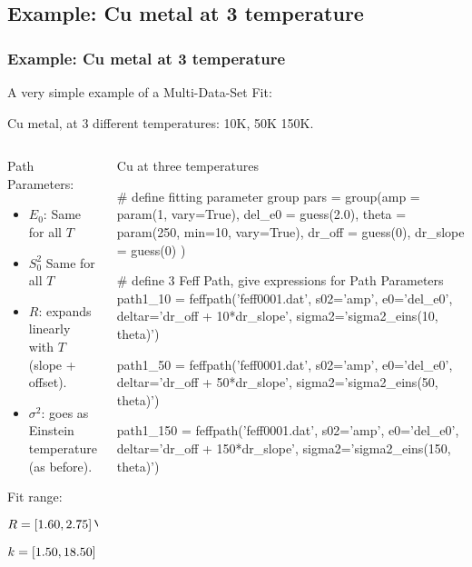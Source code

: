
\subsection{Example: Cu metal at 3 temperature}
\begin{frame}[fragile] \frametitle{Example: Cu metal at 3 temperature}


    A very simple example of a Multi-Data-Set Fit:

    Cu metal, at 3 different  temperatures: 10K, 50K 150K.

   \begin{columns}
     \begin{column}{48mm}
        \vmm  Path Parameters:
       \begin{itemize}
       \item $E_0$:  Same for all $T$
       \item $S_0^2$  Same for all $T$
       \item $R$:  expands linearly with $T$ (slope + offset).
       \item $\sigma^2$:  goes as Einstein temperature (as before).
       \end{itemize}

       {}

       \vmm Fit range: \vmm

       \hspace{2mm} $R = [1.60, 2.75] \rm\, \AA$

       \vmm
       \hspace{2mm}  $k = [1.50, 18.50] \rm\, \AA^{-1}$
     \end{column}
     \begin{column}{53mm}

  \begin{CodeBlock}{55mm}{Cu at three temperatures}

# define fitting parameter group
pars = group(amp      = param(1, vary=True),
             del_e0   = guess(2.0),
             theta    = param(250, min=10, vary=True),
             dr_off   = guess(0),
             dr_slope = guess(0) )

# define 3 Feff Path, give expressions for Path Parameters
path1_10  = feffpath('feff0001.dat',
                     s02='amp', e0='del_e0',
                     deltar='dr_off + 10*dr_slope',
                     sigma2='sigma2_eins(10, theta)')

path1_50  = feffpath('feff0001.dat',
                     s02='amp', e0='del_e0',
                     deltar='dr_off + 50*dr_slope',
                     sigma2='sigma2_eins(50, theta)')

path1_150 = feffpath('feff0001.dat',
                     s02='amp', e0='del_e0',
                     deltar='dr_off + 150*dr_slope',
                     sigma2='sigma2_eins(150, theta)')

   \end{CodeBlock}
 \end{column}
\end{columns}

\end{frame}


